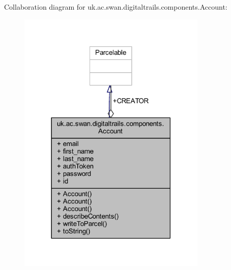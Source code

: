 Collaboration diagram for uk.\+ac.\+swan.\+digitaltrails.\+components.\+Account\+:
\nopagebreak
\begin{figure}[H]
\begin{center}
\leavevmode
\includegraphics[width=255pt]{classuk_1_1ac_1_1swan_1_1digitaltrails_1_1components_1_1_account__coll__graph}
\end{center}
\end{figure}
